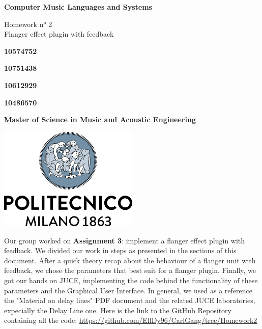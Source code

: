 \documentclass[a4paper,12pt]{report}
\begin{document}
\begin{titlepage}
\begin{center}
    \vspace*{1cm}
    
    \Huge
    \textbf{Computer Music Languages and Systems}
    
    \vspace{0.5cm}
    \LARGE
    Homework n° 2\\
   	Flanger effect plugin with feedback

    \vspace{1 cm}
    
    \textbf{10574752}
    
    \vspace{0.5cm}
    
    \textbf{10751438}
     
    \vspace{0.5cm}
    
    \textbf{10612929}
     
    
    \vspace{0.5cm}
    
    \textbf{10486570}
    
    \vspace{0.5cm}
    
    \vfill
  
   
    \date{May 2021}
    \vspace{0.3cm}
    \textbf{Master of Science in Music and Acoustic Engineering}
    
    \vspace{0.8cm}
    
    \includegraphics[width=0.5\textwidth]{logo_positivo.png}
    
\end{center}
\end{titlepage}


\abstract{}
Our group worked on \textbf{Assignment 3}: implement a 			  	flanger effect plugin with feedback. We divided our work in 		 	steps as presented in the sections of this document. After a quick theory recap about the behaviour of a flanger unit with feedback, we chose the parameters that best suit for a flanger plugin. Finally, we got our hands on JUCE, implementing the code behind the functionality of these parameters and the Graphical User Interface.
In general, we used as a reference the "Material on delay lines" PDF document and the related JUCE laboratories, expecially the Delay Line one.
Here is the link to the GitHub Repository containing all the code: \url{https://github.com/EllDy96/CarlGang/tree/Homework2}
\endabstract{}
\end{document}
